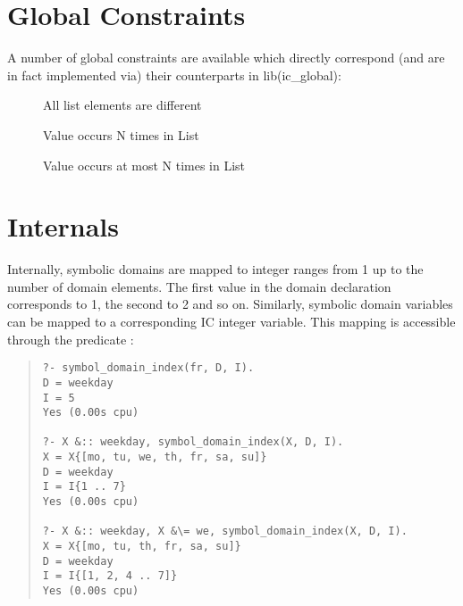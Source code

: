 \section{Global Constraints}
A number of global constraints are available which directly correspond
(and are in fact implemented via) their counterparts in
lib(ic_global):
\begin{description}
\item[]
    All list elements are different
\item[]
    Value occurs N times in List
\item[]
    Value occurs at most N times in List
\end{description}


\section{Internals}

Internally, symbolic domains are mapped to integer ranges from 1 up to
the number of domain elements.  The first value in the domain
declaration corresponds to 1, the second to 2 and so on.  Similarly,
symbolic domain variables can be mapped to a corresponding IC integer
variable.  This mapping is accessible through the predicate
:
\begin{quote}\begin{verbatim}
?- symbol_domain_index(fr, D, I).
D = weekday
I = 5
Yes (0.00s cpu)

?- X &:: weekday, symbol_domain_index(X, D, I).
X = X{[mo, tu, we, th, fr, sa, su]}
D = weekday
I = I{1 .. 7}
Yes (0.00s cpu)

?- X &:: weekday, X &\= we, symbol_domain_index(X, D, I).
X = X{[mo, tu, th, fr, sa, su]}
D = weekday
I = I{[1, 2, 4 .. 7]}
Yes (0.00s cpu)
\end{verbatim}\end{quote}
    
